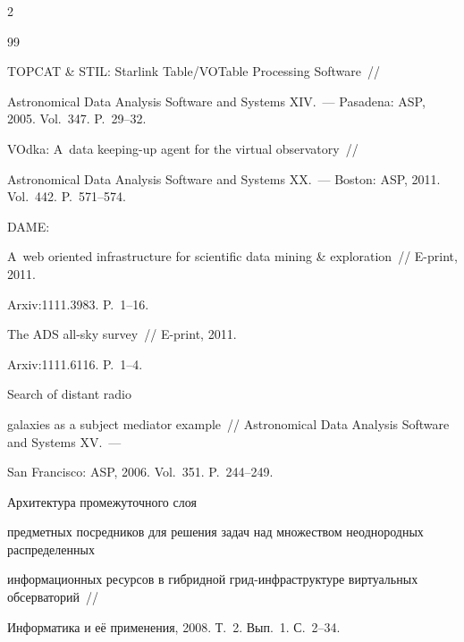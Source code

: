 \begin{multicols}{2}
{{\begin{thebibliography}{99}


TOPCAT \& STIL: Starlink Table/VOTable Processing Software~// 

Astronomical Data Analysis Software and Systems XIV.~--- Pasadena: ASP, 2005. Vol.~347. P.~29--32.



VOdka: A~data keeping-up agent for the virtual observatory~// 

Astronomical Data Analysis Software and Systems XX.~--- Boston: ASP, 2011. Vol.~442. P.~571--574.


 DAME: 

A~web oriented infrastructure for scientific data mining \& exploration~// E-print, 2011. 

Arxiv:1111.3983. P.~1--16.


 The ADS all-sky survey~// E-print, 2011. 

Arxiv:1111.6116. P.~1--4.



Search of distant radio 

galaxies as a subject mediator example~// Astronomical Data Analysis Software and Systems XV.~---

San Francisco: ASP, 2006. Vol.~351. P.~244--249. 


 Архитектура промежуточного слоя 

предметных посредников для \mbox{решения} задач над множеством неоднородных распределенных 

информационных ресурсов в гибридной грид-инфра\-струк\-ту\-ре виртуальных обсерваторий~//\linebreak 

Информатика и её применения, 2008. Т.~2. Вып.~1. С.~2--34.


\end{thebibliography}}}
\end{multicols}

